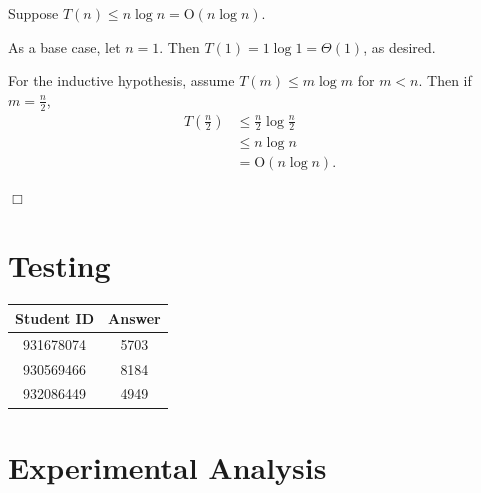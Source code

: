 \documentclass[a4paper,10pt]{article}
\begin{document}
		Suppose $T(n) \leq n \log n = \text{O}(n \log n)$.

		As a base case, let $n=1$. Then $T(1) = 1 \log 1 = \Theta(1)$, as desired.

		For the inductive hypothesis, assume $T(m) \leq m \log m$ for $m < n$. Then if $m = \frac{n}{2}$,
		\begin{align*}
		T\left(\frac{n}{2}\right) &\leq \frac{n}{2} \log \frac{n}{2} \\
		     &\leq n \log n \\
		     &= \text{O}(n \log n).
		\end{align*}

		\begin{center}
		$\Box$
		\end{center}


	\section{Testing}

		\begin{tabular}{ | c | c | }
		\hline
		Student ID & Answer\\ \hline
		931678074 & 5703 \\
		930569466 & 8184 \\
		932086449 & 4949 \\
		\hline
		\end{tabular}

	\newpage
	\section{Experimental Analysis}
\end{document}
